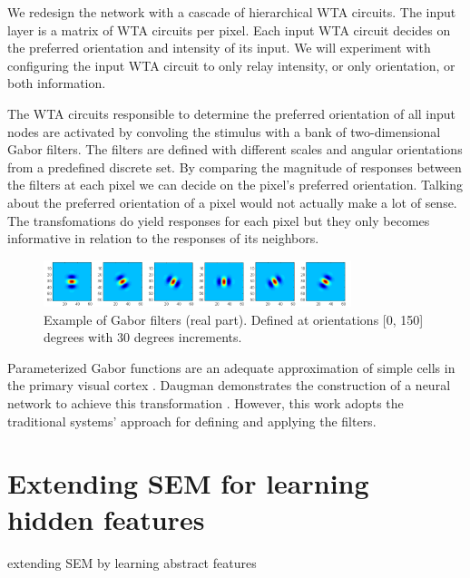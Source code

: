 \documentclass{report}
\begin{document}
We redesign the network with a cascade of hierarchical WTA circuits. The input layer is a matrix of WTA circuits per pixel. Each input WTA circuit decides on the preferred orientation and intensity of its input. We will experiment with configuring the input WTA circuit to only relay intensity, or only orientation, or both information.

The WTA circuits responsible to determine the preferred orientation of all input nodes are activated by convoling the stimulus with a bank of two-dimensional Gabor filters. The filters are defined with different scales and angular orientations from a predefined discrete set. By comparing the magnitude of responses between the filters at each pixel we can decide on the pixel's preferred orientation. Talking about the preferred orientation of a pixel would not actually make a lot of sense. The transfomations do yield responses for each pixel but they only becomes informative in relation to the responses of its neighbors.

\begin{figure}[h]
\centering
\includegraphics[width=0.8\textwidth]{filters_real}
\caption{Example of Gabor filters (real part). Defined at orientations [0, 150] degrees with 30 degrees increments. \label{fig:filters_real}}
\end{figure}

Parameterized Gabor functions are an adequate approximation of simple cells in the primary visual cortex \cite{Serre2004}. Daugman demonstrates the construction of a neural network to achieve this transformation \cite{Daugman1988}. However, this work adopts the traditional systems' approach for defining and applying the filters. 

\section{Extending SEM for learning hidden features}

extending SEM by learning abstract features
\end{document}
